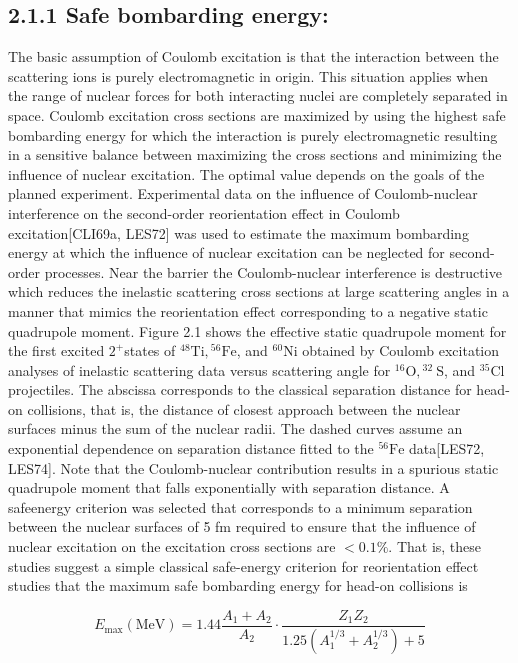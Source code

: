 \documentclass[10pt]{article}
\begin{document}
\subsection*{2.1.1 Safe bombarding energy:}
The basic assumption of Coulomb excitation is that the interaction between the scattering ions is purely electromagnetic in origin. This situation applies when the range of nuclear forces for both interacting nuclei are completely separated in space. Coulomb excitation cross sections are maximized by using the highest safe bombarding energy for which the interaction is purely electromagnetic resulting in a sensitive balance between maximizing the cross sections and minimizing the influence of nuclear excitation. The optimal value depends on the goals of the planned experiment. Experimental data on the influence of Coulomb-nuclear interference on the second-order reorientation effect in Coulomb excitation[CLI69a, LES72] was used to estimate the maximum bombarding energy at which the influence of nuclear excitation can be neglected for second-order processes. Near the barrier the Coulomb-nuclear interference is destructive which reduces the inelastic scattering cross sections at large scattering angles in a manner that mimics the reorientation effect corresponding to a negative static quadrupole moment. Figure 2.1 shows the effective static quadrupole moment for the first excited $2^{+}$states of ${ }^{48} \mathrm{Ti},{ }^{56} \mathrm{Fe}$, and ${ }^{60} \mathrm{Ni}$ obtained by Coulomb excitation analyses of inelastic scattering data versus scattering angle for ${ }^{16} \mathrm{O},{ }^{32} \mathrm{~S}$, and ${ }^{35} \mathrm{Cl}$ projectiles. The abscissa corresponds to the classical separation distance for head-on collisions, that is, the distance of closest approach between the nuclear surfaces minus the sum of the nuclear radii. The dashed curves assume an exponential dependence on separation distance fitted to the ${ }^{56} \mathrm{Fe}$ data[LES72, LES74]. Note that the Coulomb-nuclear contribution results in a spurious static quadrupole moment that falls exponentially with separation distance. A safeenergy criterion was selected that corresponds to a minimum separation between the nuclear surfaces of 5 fm required to ensure that the influence of nuclear excitation on the excitation cross sections are $<0.1 \%$. That is, these studies suggest a simple classical safe-energy criterion for reorientation effect studies that the maximum safe bombarding energy for head-on collisions is


\begin{equation*}
E_{\max }(\mathrm{MeV})=1.44 \frac{A_{1}+A_{2}}{A_{2}} \cdot \frac{Z_{1} Z_{2}}{1.25\left(A_{1}^{1 / 3}+A_{2}^{1 / 3}\right)+5} \tag{2.1}
\end{equation*}
\end{document}
